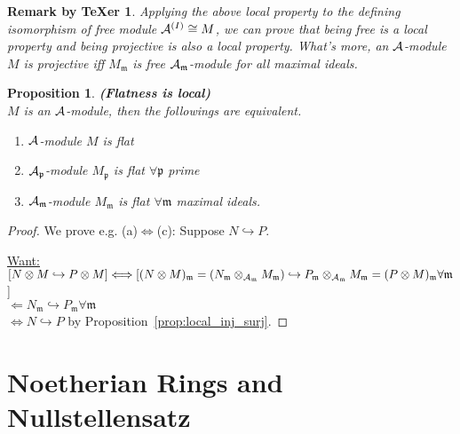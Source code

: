 \documentclass[11pt]{article}
\newtheorem{prop}[thm]{Proposition}
\newtheorem{rmkt}[thm]{Remark by TeXer}
\newcommand{\scm}{{\mathfrak m}}
\newcommand{\scp}{{\mathfrak p}}
\newcommand{\cala}{{\cal A}}
\newcommand{\Llrta}{\Longleftrightarrow}
\newcommand{\inj}{\hookrightarrow}
\begin{document}
\begin{rmkt}
Applying the above local property to the defining isomorphism of free module $\cala^{(I)}\cong M$, we can prove that being free is a local property and being projective is also a local property. What's more, an $\cala$-module $M$ is projective iff $M_\scm$ is free $\cala_\scm$-module for all maximal ideals.
\end{rmkt}
\begin{prop}
\textbf{(Flatness is local)}\\
$M$ is an $\cala$-module, then the followings are equivalent.
\begin{enumerate}[label=(\alph*)]
\item $\cala$-module $M$ is flat
\item $\cala_\scp$-module $M_\scp$ is flat $\forall \scp$ prime
\item $\cala_\scm$-module $M_\scm$ is flat $\forall \scm$ maximal ideals.
\end{enumerate}
\end{prop}
\begin{proof}We prove e.g. 
(a)$\Llrta$(c): Suppose $N\inj P$.

\underline{Want:} $[N\otimes M\inj P\otimes M]\Llrta [(N\otimes M)_\scm=(N_\scm\otimes_{\cala_\scm}M_\scm)\inj P_\scm\otimes_{\cala_\scm} M_\scm= (P\otimes M)_\scm\forall \scm$ ]\\
$\Longleftarrow N_\scm\inj P_\scm\forall \scm$\\
$\Llrta N\inj P$ by Proposition~\ref{prop:local_inj_surj}.
\end{proof}
\section{Noetherian Rings and Nullstellensatz}
\end{document}
